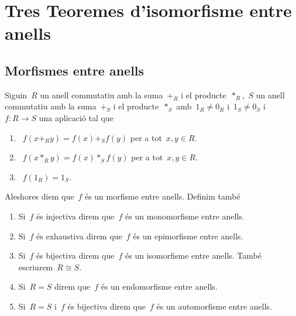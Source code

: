 \documentclass[../../main.tex]{subfiles}
\begin{document}
\section{Tres Teoremes d'isomorfisme entre anells}
    \subsection{Morfismes entre anells}
    \begin{definition}
        \label{def:morfisme entre anells}
        \label{def:epimorfisme entre anells}
        \label{def:monomorfisme entre anells}
        \label{def:isomorfisme entre anells}
        \label{def:endomorfisme entre anells}
        Siguin~\(R\) un anell commutatiu amb la suma~\(+_{R}\) i el producte~\(\ast_{R}\),~\(S\) un anell commutatiu amb la suma~\(+_{S}\) i el producte~\(\ast_{S}\) amb~\(1_{R}\neq0_{R}\) i~\(1_{S}\neq0_{S}\) i~\(f\colon R\longrightarrow S\) una aplicació tal que
        \begin{enumerate}
            \item~\(f(x+_{R}y)=f(x)+_{S}f(y)\) per a tot~\(x,y\in R\).
            \item~\(f(x\ast_{R}y)=f(x)\ast_{S}f(y)\) per a tot~\(x,y\in R\).
            \item~\(f(1_{R})=1_{S}\).
        \end{enumerate}
        Aleshores diem que~\(f\) és un morfisme entre anells.
        Definim també
        \begin{enumerate}
            \item Si~\(f\) és injectiva direm que~\(f\) és un monomorfisme entre anells.
            \item Si~\(f\) és exhaustiva direm que~\(f\) és un epimorfisme entre anells.
            \item Si~\(f\) és bijectiva direm que~\(f\) és un isomorfisme entre anells.
            També escriurem~\(R\cong S\).
            \item Si~\(R=S\) direm que~\(f\) és un endomorfisme entre anells.
            \item Si~\(R=S\) i~\(f\) és bijectiva direm que~\(f\) és un automorfisme entre anells.
        \end{enumerate}
    \end{definition}
\end{document}
